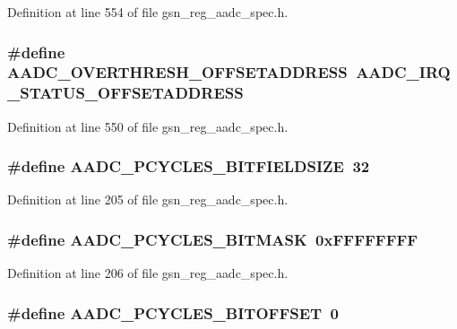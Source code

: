 Definition at line 554 of file gsn\_\-reg\_\-aadc\_\-spec.h.

\hypertarget{a00543_aebadcb69c86ca2da5f758972eccfd8f4}{
\subsubsection[{AADC\_\-OVERTHRESH\_\-OFFSETADDRESS}]{\setlength{\rightskip}{0pt plus 5cm}\#define AADC\_\-OVERTHRESH\_\-OFFSETADDRESS~AADC\_\-IRQ\_\-STATUS\_\-OFFSETADDRESS}}
\label{a00543_aebadcb69c86ca2da5f758972eccfd8f4}


Definition at line 550 of file gsn\_\-reg\_\-aadc\_\-spec.h.

\hypertarget{a00543_a96ef5de72f25961f9c98d632ecc98044}{
\subsubsection[{AADC\_\-PCYCLES\_\-BITFIELDSIZE}]{\setlength{\rightskip}{0pt plus 5cm}\#define AADC\_\-PCYCLES\_\-BITFIELDSIZE~32}}
\label{a00543_a96ef5de72f25961f9c98d632ecc98044}


Definition at line 205 of file gsn\_\-reg\_\-aadc\_\-spec.h.

\hypertarget{a00543_a7a98dc6f3de1e5d3bf0deb585b6c88ad}{
\subsubsection[{AADC\_\-PCYCLES\_\-BITMASK}]{\setlength{\rightskip}{0pt plus 5cm}\#define AADC\_\-PCYCLES\_\-BITMASK~0xFFFFFFFF}}
\label{a00543_a7a98dc6f3de1e5d3bf0deb585b6c88ad}


Definition at line 206 of file gsn\_\-reg\_\-aadc\_\-spec.h.

\hypertarget{a00543_aa24237c26fe6bd8bcd21f286274510d5}{
\subsubsection[{AADC\_\-PCYCLES\_\-BITOFFSET}]{\setlength{\rightskip}{0pt plus 5cm}\#define AADC\_\-PCYCLES\_\-BITOFFSET~0}}
\label{a00543_aa24237c26fe6bd8bcd21f286274510d5}


